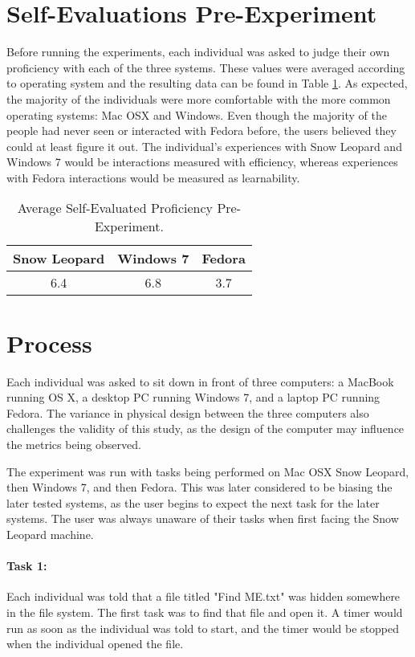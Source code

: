 \documentclass[11pt,letterpaper]{report}
\begin{document}
\section{Self-Evaluations Pre-Experiment}

Before running the experiments, each individual was asked to judge their own proficiency with each of the three systems. These values were averaged according to operating system and the resulting data can be found in Table \ref{pAvg}. As expected, the majority of the individuals were more comfortable with the more common operating systems: Mac OSX and Windows. Even though the majority of the people had never seen or interacted with Fedora before, the users believed they could at least figure it out. The individual's experiences with Snow Leopard and Windows 7 would be interactions measured with efficiency, whereas experiences with Fedora interactions would be measured as learnability. 

\begin{table}
    \centering
    \begin{tabular}{| c | c | c |}
        \hline
        Snow Leopard & Windows 7 & Fedora \\ \hline
        6.4 & 6.8 & 3.7 \\
        \hline
    \end{tabular}
    \caption{Average Self-Evaluated Proficiency Pre-Experiment.}
    \label{pAvg}
\end{table}

\section{Process}

Each individual was asked to sit down in front of three computers: a MacBook running OS X, a desktop PC running Windows 7, and a laptop PC running Fedora. The variance in physical design between the three computers also challenges the validity of this study, as the design of the computer may influence the metrics being observed. 

The experiment was run with tasks being performed on Mac OSX Snow Leopard, then Windows 7, and then Fedora. This was later considered to be biasing the later tested systems, as the user begins to expect the next task for the later systems. The user was always unaware of their tasks when first facing the Snow Leopard machine. 

\paragraph{Task 1:} Each individual was told that a file titled "Find ME.txt" was hidden somewhere in the file system. The first task was to find that file and open it. A timer would run as soon as the individual was told to start, and the timer would be stopped when the individual opened the file. 
\end{document}
